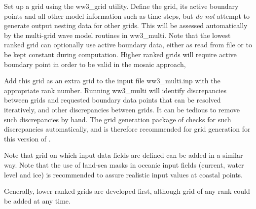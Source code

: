 \begin{list}{)}{
             \rightmargin 5mm 
              \leftmargin 10mm}

\item Set up a grid using the {\file ww3\_grid} utility. Define the grid, its
      active boundary points and all other model information such as time
      steps, but {\it do not} attempt to generate output nesting data for
      other grids. This will be assessed automatically by the multi-grid wave
      model routines in {\file ww3\_multi}. Note that the lowest ranked grid
      can optionally use active boundary data, either as read from file or to
      be kept constant during computation. Higher ranked grids will require
      active boundary point in order to be valid in the mosaic approach,

\item Add this grid as an extra grid to the input file {\file ww3\_multi.inp}
      with the appropriate rank number. Running {\file ww3\_multi} will
      identify discrepancies between grids and requested boundary data points
      that can be resolved iteratively, and other discrepancies between grids.
      It can be tedious to remove such discrepancies by hand. The grid
      generation package of \citet{tol:MMAB07a, tol:OMOD08a} checks for such
      discrepancies automatically, and is therefore recommended for grid
      generation for this version of \ws.

\end{list}

\noindent
Note that grid on which input data fields are defined can be added in a
similar way. Note that the use of land-sea masks in oceanic input fields
(current, water level and ice) is recommended to assure realistic input values
at coastal points.

Generally, lower ranked grids are developed first, although grid of any rank
could be added at any time.

